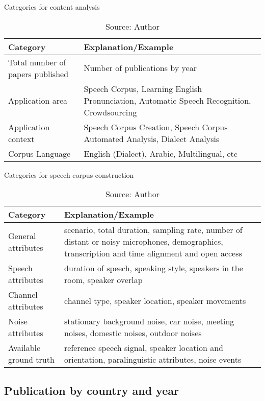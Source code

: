 \begin{table}[ht]
    \centering
    \caption{Categories for content analysis}
    \begin{tabular}{|p{4cm}|p{11cm}|}
        \hline Category & Explanation/Example \\ \hline
        Total number of papers published & Number of publications by year \\ \hline
        Application area & Speech Corpus, Learning English Pronunciation, Automatic Speech Recognition, Crowdsourcing \\ \hline
        Application context & Speech Corpus Creation, Speech Corpus Automated Analysis, Dialect Analysis \\ \hline
        Corpus Language & English (Dialect), Arabic, Multilingual, etc \\ \hline
    \end{tabular}
    \caption*{Source: Author}
    \label{tab:content-analysis}
\end{table}

\begin{table}[ht]
    \centering
    \caption{Categories for speech corpus construction}
    \begin{tabular}{|p{4cm}|p{11cm}|}
        \hline Category & Explanation/Example \\ \hline
        General attributes & scenario, total duration, sampling rate, number of distant or noisy microphones, demographics, transcription and time alignment and open access \\ \hline
        Speech attributes & duration of speech, speaking style, speakers in the room, speaker overlap\\ \hline
        Channel attributes & channel type, speaker location, speaker movements \\ \hline
        Noise attributes & stationary background noise, car noise, meeting noises, domestic noises, outdoor noises \\ \hline
        Available ground truth & reference speech signal, speaker location and orientation, paralinguistic attributes, noise events \\ \hline
    \end{tabular}
    \caption*{Source: Author}
    \label{tab:speech-analysis}
\end{table}

\subsection{Publication by country and year}

